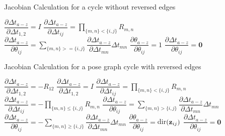 \begin{algorithm}[H]
  \caption{Jacobian Calculation for a cycle without reversed edges}\label{algo:non_reversed}
  \begin{algorithmic}[1]
    \State $\dfrac{\partial \Delta t_{a-z}}{\partial \Delta t_{1,2}} = I$
      \State $\dfrac{\partial \Delta t_{a-z}}{\partial \Delta t_{ij}} = \prod_{\{m,n\} < \{i,j\}} R_{m,n}$
    \EndFor
      \State $\dfrac{\partial \Delta t_{a-z}}{\partial \theta_{ij}} = \sum_{\{m,n\} >= \{i,j\}} \dfrac{\partial \Delta t_{a-z}}{\partial \Delta t_{mn}} \Delta t_{mn}$
      \State $\dfrac{\partial \theta_{a-z}}{\partial \theta_{ij}} = 1$
      \State $\dfrac{\partial \Delta t_{a-z}}{\partial \theta_{ij}} = \textbf{0}$
    \EndFor
  \end{algorithmic}
\end{algorithm}

\begin{algorithm}[H]
  \caption{Jacobian Calculation for a pose graph cycle with reversed edges}\label{algo:reversed}
  \begin{algorithmic}[1]
      \State $\dfrac{\partial \Delta t_{a-z}}{\partial \Delta t_{1,2}} = -R_{12}$
    \Else
      \State $\dfrac{\partial \Delta t_{a-z}}{\partial \Delta t_{1,2}} = I$
    \EndIf
        \State $\dfrac{\partial \Delta t_{a-z}}{\partial \Delta t_{ij}} = \prod_{\{m,n\} < \{i,j\}} R_{m,n}$
      \Else
        \State $\dfrac{\partial \Delta t_{a-z}}{\partial \Delta t_{ij}} = -\prod_{\{m,n\} \leq \{i,j\}} R_{m,n}$
      \EndIf
    \EndFor
        \State $\dfrac{\partial \Delta t_{a-z}}{\partial \theta_{ij}} = \sum_{\{m,n\} > \{i,j\}} \dfrac{\partial \Delta t_{a-z}}{\partial \Delta t_{mn}} \Delta t_{mn}$
      \Else
        \State $\dfrac{\partial \Delta t_{a-z}}{\partial \theta_{ij}} =
        - \sum_{\{m,n\} \geq \{i,j\}} \dfrac{\partial \Delta t_{a-z}}{\partial \Delta t_{mn}} \Delta t_{mn}$
      \EndIf
      \State $\dfrac{\partial \theta_{a-z}}{\partial \theta_{ij}} = $dir$\left( \mathbf{z}_{ij} \right)$
      \State $\dfrac{\partial \Delta t_{a-z}}{\partial \theta_{ij}} = \textbf{0}$
    \EndFor
  \end{algorithmic}
\end{algorithm}
